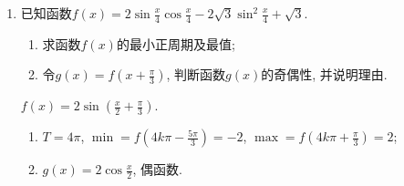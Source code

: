 \begin{enumerate}
\item 已知函数$f(x)=2\sin\frac{x}{4}\cos\frac{x}{4}-2\sqrt{3}\sin^2\frac{x}{4}+\sqrt{3}$. 
\begin{enumerate}[(1)]
\item 求函数$f(x)$的最小正周期及最值;
\item 令$g(x)=f\left(x+\frac{\pi}{3}\right)$, 判断函数$g(x)$的奇偶性, 并说明理由. 
\end{enumerate}
\begin{jieda}
$f(x)=2\sin(\frac{x}{2}+\frac{\pi}{3})$. 
\begin{enumerate}
\item $T=4\pi$, $\min=f(4k\pi-\frac{5\pi}{3})=-2$, $\max=f(4k\pi+\frac{\pi}{3})=2$; 
\item $g(x)=2\cos\frac{x}{2}$, 偶函数. 
\end{enumerate}
\end{jieda}
\end{enumerate}



